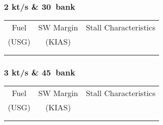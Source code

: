 % 
% 
%
\Large
\subsubsection*{2 kt/s \& 30\textdegree\ bank}
  \begin{tabularx}{\textwidth}{|c|c|X|}
    \hline
    Fuel&SW Margin&Stall Characteristics\\
    (USG)&(KIAS)&\\
    \hline
    \hline
    &&\\
    \hline
    &&\\
    \hline
    \end{tabularx}     

\subsubsection*{3 kt/s \& 45\textdegree\ bank}
  \begin{tabularx}{\textwidth}{|c|c|X|}
    \hline
    Fuel&SW Margin&Stall Characteristics\\
    (USG)&(KIAS)&\\
    \hline
    \hline
    &&\\
    \hline
    &&\\
    \hline
    \end{tabularx}     

    \normalsize

   